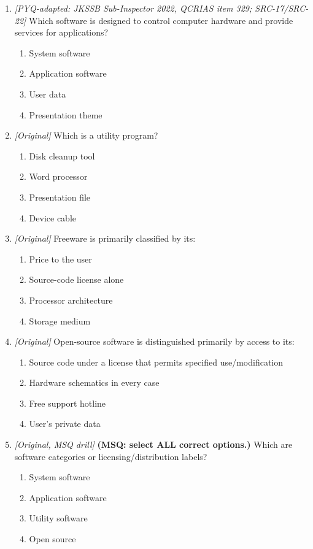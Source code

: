 \begin{enumerate}[label=\textbf{Q\arabic*.}, leftmargin=*]
\begin{enumerate}[label=\Alph*.]
    \item An operating system is application software.
  \end{enumerate}
\item \textit{[PYQ-adapted: JKSSB Sub-Inspector 2022, QCRIAS item 329; SRC-17/SRC-22]} Which software is designed to control computer hardware and provide services for applications?
  \begin{enumerate}[label=\Alph*.]
\item System software
   \item Application software
   \item User data
   \item Presentation theme
  \end{enumerate}

\item \textit{[Original]} Which is a utility program?
  \begin{enumerate}[label=\Alph*.]
\item Disk cleanup tool
   \item Word processor
   \item Presentation file
   \item Device cable
  \end{enumerate}

\item \textit{[Original]} Freeware is primarily classified by its:
  \begin{enumerate}[label=\Alph*.]
\item Price to the user
   \item Source-code license alone
   \item Processor architecture
   \item Storage medium
  \end{enumerate}

\item \textit{[Original]} Open-source software is distinguished primarily by access to its:
  \begin{enumerate}[label=\Alph*.]
\item Source code under a license that permits specified use/modification
   \item Hardware schematics in every case
   \item Free support hotline
   \item User's private data
  \end{enumerate}

\item \textit{[Original, MSQ drill]} \textbf{(MSQ: select ALL correct options.)} Which are software categories or licensing/distribution labels?
  \begin{enumerate}[label=\Alph*.]
\item System software
   \item Application software
   \item Utility software
   \item Open source
  \end{enumerate}

\end{enumerate}
